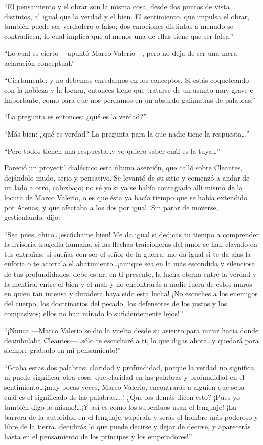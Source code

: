 \documentclass[11pt,openany]{book}
\begin{document}
“El pensamiento y el obrar son la misma cosa, desde dos puntos de vista distintos, al igual que la verdad y el bien. El sentimiento, que impulsa el obrar, también puede ser verdadero o falso; dos emociones distintas a menudo se contradicen, lo cual implica que al menos una de ellas tiene que ser falsa.” 

“Lo cual es cierto —apuntó Marco Valerio—, pero no deja de ser una mera aclaración conceptual.” 

“Ciertamente; y no debemos enredarnos en los conceptos. Si estás coqueteando con la nobleza y la locura, entonces tiene que tratarse de un asunto muy grave e importante, como para que nos perdamos en un absurdo galimatías de palabras.” 

“La pregunta es entonces: ¿qué es la verdad?” 

“Más bien: ¿qué es verdad? La pregunta para la que nadie tiene la respuesta\dots” 

“Pero todos tienen una respuesta\dots y yo quiero saber cuál es la tuya\dots” 

Pareció un proyectil dialéctico esta última aserción, que calló sobre Cleantes, dejándolo mudo, serio y pensativo. Se levantó de su sitio y comenzó a andar de un lado a otro, cabizbajo; no sé yo si ya se había contagiado allí mismo de la locura de Marco Valerio, o es que ésta ya hacía tiempo que se había extendido por Atenas, y que afectaba a los dos por igual. Sin parar de moverse, gesticulando, dijo: 

“Sea pues, chico\dots ¡escúchame bien! Me da igual si dedicas tu tiempo a comprender la irrisoria tragedia humana, si las flechas traicioneras del amor se han clavado en tus entrañas, si sueñas con ser el señor de la guerra; me da igual si te da alas la euforia o te acorrala el abatimiento\dots ¡aunque sea en la más escondida y silenciosa de tus profundidades, debe estar, en ti presente, la lucha eterna entre la verdad y la mentira, entre el bien y el mal; y no encontrarás a nadie fuera de estos muros en quien tan intensa y duradera haya sido esta lucha! ¡No escuches a los enemigos del cuerpo, los doctrinarios del pecado, los defensores de los justos y los compasivos; ellos no han mirado lo suficientemente lejos!” 

“¡Nunca —Marco Valerio se dio la vuelta desde su asiento para mirar hacia donde deambulaba Cleantes—\dots sólo te escucharé a ti, lo que digas ahora\dots y quedará para siempre grabado en mi pensamiento!” 

“Graba estas dos palabras: claridad y profundidad, porque la verdad no significa, ni puede significar otra cosa, que claridad en las palabras y profundidad en el sentimiento\dots ¡muy pocas veces, Marco Valerio, encontrarás a alguien que sepa cuál es el significado de las palabras\dots.! ¿Que los demás dicen esto? ¡Pues yo también digo lo mismo!\dots ¡Y así es como los superfluos usan el lenguaje! ¡La barrera de la autoridad en el lenguaje, supérala y serás el hombre más poderoso y libre de la tierra\dots decidirás lo que puede decirse y dejar de decirse, y aparecerás hasta en el pensamiento de los príncipes y los emperadores!” 
\end{document}
